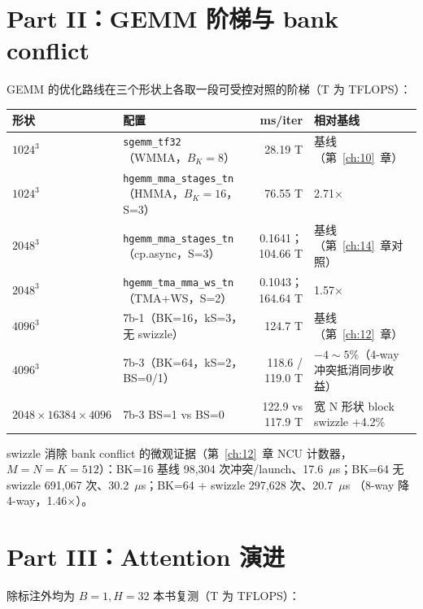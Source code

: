 \section{Part II：GEMM 阶梯与 bank conflict}

GEMM 的优化路线在三个形状上各取一段可受控对照的阶梯（T 为 TFLOPS）：

\begin{center}\small
\begin{tabular}{lp{5.2cm}rp{2.6cm}}
\toprule
形状 & 配置 & ms/iter & 相对基线 \\
\midrule
$1024^3$ & \texttt{sgemm\_tf32}（WMMA，$B_K{=}8$） & 28.19 T & 基线（第~\ref{ch:10}~章） \\
$1024^3$ & \texttt{hgemm\_\allowbreak{}mma\_\allowbreak{}stages\_\allowbreak{}tn}（HMMA，$B_K{=}16$，S=3） & 76.55 T & 2.71$\times$ \\
$2048^3$ & \texttt{hgemm\_\allowbreak{}mma\_\allowbreak{}stages\_\allowbreak{}tn}（cp.async，S=3） & 0.1641；104.66 T & 基线（第~\ref{ch:14}~章对照） \\
$2048^3$ & \texttt{hgemm\_\allowbreak{}tma\_\allowbreak{}mma\_\allowbreak{}ws\_\allowbreak{}tn}（TMA+WS，S=2） & 0.1043；164.64 T & 1.57$\times$ \\
$4096^3$ & 7b-1（BK=16，kS=3，无 swizzle） & 124.7 T & 基线（第~\ref{ch:12}~章） \\
$4096^3$ & 7b-3（BK=64，kS=2，BS=0/1） & 118.6 / 119.0 T & $-4\sim5\%$（4-way 冲突抵消同步收益） \\
$2048{\times}16384{\times}4096$ & 7b-3 BS=1 vs BS=0 & 122.9 vs 117.9 T & 宽 N 形状 block swizzle +4.2\% \\
\bottomrule
\end{tabular}
\end{center}

swizzle 消除 bank conflict 的微观证据（第~\ref{ch:12}~章 NCU 计数器，
$M{=}N{=}K{=}512$）：BK=16 基线 98{,}304 次冲突/launch、17.6~$\mu$s；BK=64 无
swizzle 691{,}067 次、30.2~$\mu$s；BK=64 + swizzle 297{,}628 次、20.7~$\mu$s
（8-way 降 4-way，1.46$\times$）。

\section{Part III：Attention 演进}

除标注外均为 $B{=}1, H{=}32$ 本书复测（T 为 TFLOPS）：

